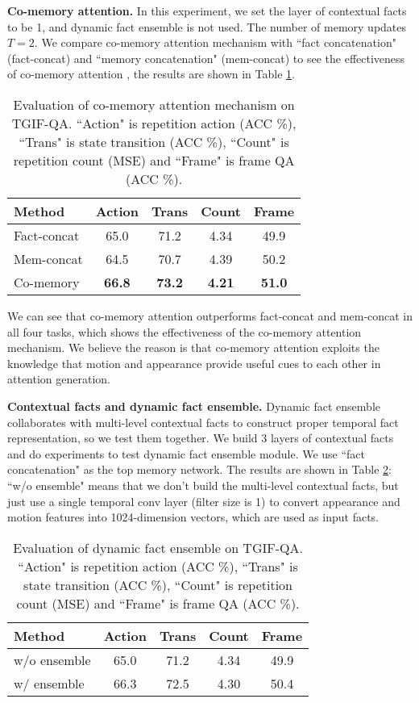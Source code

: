 \documentclass[10pt,twocolumn,letterpaper]{article}
\begin{document}
\textbf{Co-memory attention.} In this experiment, we set the layer of contextual facts to be 1, and dynamic fact ensemble is not used. The number of memory updates  $T=2$. We compare co-memory attention mechanism with ``fact concatenation" (fact-concat) and ``memory concatenation" (mem-concat) to see the effectiveness of co-memory attention , the results are shown in Table \ref{tbl:comem}.
\begin{table}[h]
\centering
\caption{Evaluation of co-memory attention mechanism on TGIF-QA. ``Action" is repetition action (ACC \%), ``Trans" is state transition (ACC \%), ``Count" is repetition count (MSE) and ``Frame" is frame QA (ACC \%). }
\vspace{5pt}
\label{tbl:comem}
\begin{tabular}{l|cccc}
\hline
Method      & Action & Trans & Count & Frame \\ \hline
Fact-concat &    65.0    &  71.2     &    4.34   &     49.9  \\ \hline
Mem-concat  &   64.5     &  70.7    &   4.39    &    50.2   \\ \hline
Co-memory   &    \textbf{66.8} & \textbf{73.2}   &  \textbf{4.21}    &    \textbf{51.0}   \\ \hline
\end{tabular}
\end{table}
We can see that co-memory attention outperforms fact-concat and mem-concat in all four tasks, which shows the effectiveness of the co-memory attention mechanism. We believe the reason is that co-memory attention exploits the knowledge that motion and appearance provide useful cues to each other in attention generation. 




\textbf{Contextual facts and dynamic fact ensemble.} Dynamic fact ensemble collaborates with multi-level contextual facts to construct proper temporal fact representation, so we test them together. We build 3 layers of contextual facts and do experiments to test dynamic fact ensemble module. We use ``fact concatenation" as the top memory network. The results are shown in Table \ref{tbl:facts}: ``w/o ensemble" means that we don't build the multi-level contextual facts, but just use a single temporal conv layer (filter size is 1) to convert appearance and motion features into 1024-dimension vectors, which are used as input facts. 

\begin{table}[h]
\centering
\caption{ Evaluation of dynamic fact ensemble on TGIF-QA. ``Action" is repetition action (ACC \%), ``Trans" is state transition (ACC \%), ``Count" is repetition count (MSE) and ``Frame" is frame QA (ACC \%). }
\vspace{5pt}
\label{tbl:facts}
\begin{tabular}{l|cccc}
\hline
Method      & Action & Trans & Count & Frame \\ \hline
w/o ensemble &   65.0    &  71.2     &    4.34   &     49.9       \\ \hline
w/ ensemble   &    66.3    &    72.5   &  4.30     &  50.4     \\ \hline
\end{tabular}
\end{table}
\end{document}
